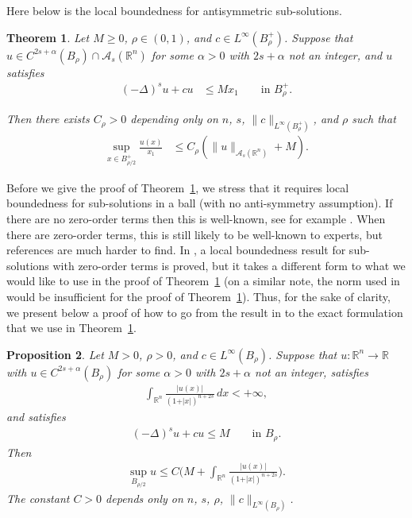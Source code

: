 \documentclass[a4paper,12pt,reqno]{amsart}
\numberwithin{equation}{section}
\newtheorem{theorem}{Theorem}[section]
\newtheorem{proposition}[theorem]{Proposition}
\theoremstyle{definition}
\theoremstyle{notation}
\newcommand{\R}{\mathds{R}}
\begin{document}
Here below is the local boundedness for antisymmetric sub-solutions. 








\begin{theorem} \label{R5gjD59t}
Let \(M \geqslant 0\), \(\rho\in(0,1)\), and \(c\in L^\infty(B_\rho^+)\). Suppose that \(u \in C^{2s+\alpha}(B_\rho)\cap \mathscr A_s (\R^n)\) for some \(\alpha>0\) with \(2s+\alpha\) not an integer, and \(u\) satisfies  \begin{align*}
(-\Delta)^su +cu &\leqslant M x_1 \qquad \text{in } B_\rho^+.
\end{align*}


Then there exists \(C_\rho>0\) depending only on \(n\), \(s\), \(\| c \|_{L^\infty(B_\rho^+)}\), and \(\rho\) such that  \begin{align*}
\sup_{x\in B_{\rho/2}^+} \frac{ u(x)}{x_1} &\leqslant C_\rho (  \| u\|_{  \mathscr A_s(\R^n) } +M  ) .
\end{align*} 
\end{theorem}


Before we give the proof of Theorem~\ref{R5gjD59t}, we stress 
that it requires local boundedness for sub-solutions in a ball (with no anti-symmetry assumption). If there are no zero-order terms then this is well-known, see for example \cite[Theorem~5.1]{CS11}. When there are zero-order terms, this is still likely to be well-known to experts, but references are much harder to find. In \cite{kim_holder_2023}, a local boundedness result for sub-solutions with zero-order terms is proved, but it takes a different form to what we would like to use in the proof of Theorem~\ref{R5gjD59t}
(on a similar note, the norm used in~\cite[Theorem~6.2]{MR2825646}
would be insufficient for the proof of Theorem~\ref{R5gjD59t}). Thus, for the sake of clarity, we present below a proof of how to go from the result in \cite{kim_holder_2023} to the exact formulation that we use in Theorem~\ref{R5gjD59t}.


\begin{proposition} \label{RmPesNtb}
    Let \(M > 0\), \(\rho>0\), and \(c \in  L^\infty(B_\rho)\). Suppose that \(u:\R^n\to\R\) with \(u \in C^{2s+\alpha}(B_\rho)\) for some \(\alpha > 0\) with \(2s + \alpha\) not an integer, satisfies \begin{align*}
    \int_{\R^n} \frac{\vert u(x) \vert }{(1+\vert x \vert)^{n+2s}} \, dx<+\infty,
\end{align*} and satisfies \begin{align*}
     (-\Delta)^su + cu \leq  M \qquad \text{in }B_\rho.
\end{align*} Then \begin{align*}
    \sup_{B_{\rho/2}} u \leq C \bigg ( M+ \int_{\R^n} \frac{\vert u(x) \vert }{(1+\vert x \vert)^{n+2s}}  \bigg).
\end{align*} The constant \(C>0\) depends only on \(n\), \(s\), \(\rho\), \(\| c\|_{L^\infty(B_\rho)}\). 
\end{proposition}
\end{document}
